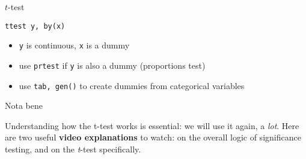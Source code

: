 \documentclass[t]{beamer}
\begin{document}
  \begin{frame}[t]{$t$-test}
    
    \begin{block}{\texttt{ttest y, by(x)}}

      \begin{itemize}
        \item \texttt{y} is continuous, \texttt{x} is a dummy
        \item use \texttt{prtest} if \texttt{y} is also a dummy (proportions test)
        \item use \texttt{tab, gen()} to create dummies from categorical variables
      \end{itemize}

    \end{block}

    \begin{alertblock}{Nota bene}

      Understanding how the t-test works is essential: we will use it again, a \emph{lot}. Here are two useful \textbf{video explanations} to watch:  on the overall logic of significance testing, and  on the \emph{t}-test specifically.%

    \end{alertblock}

  
  \end{frame}
  
\end{document}
